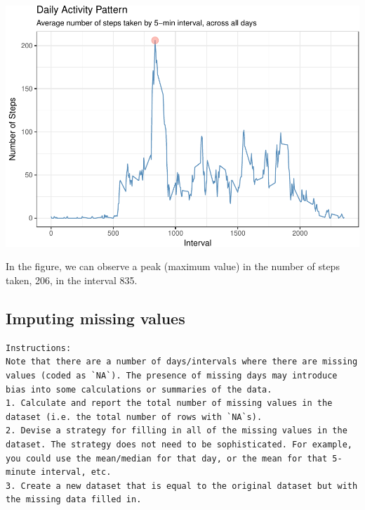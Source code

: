 \documentclass[]{article}
\begin{document}
\begin{center}\includegraphics{figure/activity pattern-1} \end{center}

In the figure, we can observe a peak (maximum value) in the number of
steps taken, 206, in the interval 835.

\subsection{Imputing missing values}\label{imputing-missing-values}

\begin{verbatim}
Instructions:
Note that there are a number of days/intervals where there are missing values (coded as `NA`). The presence of missing days may introduce bias into some calculations or summaries of the data.
1. Calculate and report the total number of missing values in the dataset (i.e. the total number of rows with `NA`s).
2. Devise a strategy for filling in all of the missing values in the dataset. The strategy does not need to be sophisticated. For example, you could use the mean/median for that day, or the mean for that 5-minute interval, etc.
3. Create a new dataset that is equal to the original dataset but with the missing data filled in.
\end{verbatim}
\end{document}
